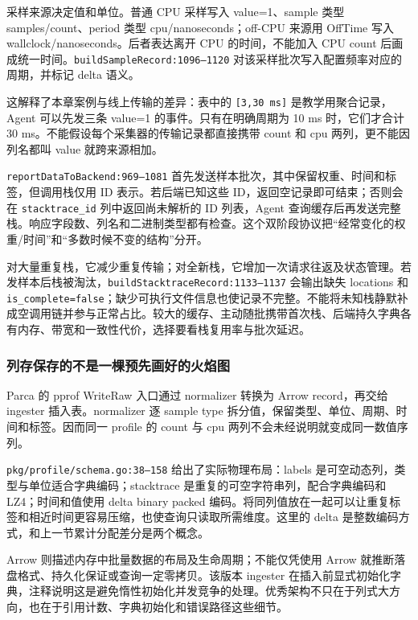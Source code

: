 \documentclass[UTF8,fontset=fandol,openany,11pt]{ctexbook}
\begin{document}
采样来源决定值和单位。普通 CPU 采样写入 value=1、sample 类型 samples/count、period 类型 cpu/nanoseconds；off-CPU 来源用 OffTime 写入 wallclock/nanoseconds。后者表达离开 CPU 的时间，不能加入 CPU count 后画成统一时间。\texttt{buildSampl\allowbreak{}eRecord:\allowbreak{}1096–1120} 对该采样批次写入配置频率对应的周期，并标记 delta 语义。

这解释了本章案例与线上传输的差异：表中的 \texttt{[3,30 ms]} 是教学用聚合记录，Agent 可以先发三条 value=1 的事件。只有在明确周期为 10 ms 时，它们才合计 30 ms。不能假设每个采集器的传输记录都直接携带 count 和 cpu 两列，更不能因列名都叫 value 就跨来源相加。

\texttt{reportData\allowbreak{}ToBackend:\allowbreak{}969–1081} 首先发送样本批次，其中保留权重、时间和标签，但调用栈仅用 ID 表示。若后端已知这些 ID，返回空记录即可结束；否则会在 \texttt{stacktrace\_\allowbreak{}id} 列中返回尚未解析的 ID 列表，Agent 查询缓存后再发送完整栈。响应字段数、列名和二进制类型都有检查。这个双阶段协议把“经常变化的权重/时间”和“多数时候不变的结构”分开。\cite{proj-parca-agent}

对大量重复栈，它减少重复传输；对全新栈，它增加一次请求往返及状态管理。若发样本后栈被淘汰，\texttt{buildStack\allowbreak{}traceRecor\allowbreak{}d:\allowbreak{}1133–1137} 会输出缺失 locations 和 \texttt{is\_\allowbreak{}complete=false}；缺少可执行文件信息也使记录不完整。不能将未知栈静默补成空调用链并参与正常占比。较大的缓存、主动随批携带首次栈、后端持久字典各有内存、带宽和一致性代价，选择要看栈复用率与批次延迟。

\subsubsection{列存保存的不是一棵预先画好的火焰图}
Parca 的 pprof WriteRaw 入口通过 normalizer 转换为 Arrow record，再交给 ingester 插入表。normalizer 逐 sample type 拆分值，保留类型、单位、周期、时间和标签。因而同一 profile 的 count 与 cpu 两列不会未经说明就变成同一数值序列。\cite{proj-parca-store}

\texttt{pkg/\allowbreak{}profile/\allowbreak{}schema.\allowbreak{}go:\allowbreak{}38–158} 给出了实际物理布局：labels 是可空动态列，类型与单位适合字典编码；stacktrace 是重复的可空字符串列，配合字典编码和 LZ4；时间和值使用 delta binary packed 编码。将同列值放在一起可以让重复标签和相近时间更容易压缩，也使查询只读取所需维度。这里的 delta 是整数编码方式，和上一节累计分配差分是两个概念。

Arrow 则描述内存中批量数据的布局及生命周期；不能仅凭使用 Arrow 就推断落盘格式、持久化保证或查询一定零拷贝。该版本 ingester 在插入前显式初始化字典，注释说明这是避免惰性初始化并发竞争的处理。优秀架构不只在于列式大方向，也在于引用计数、字典初始化和错误路径这些细节。
\end{document}
